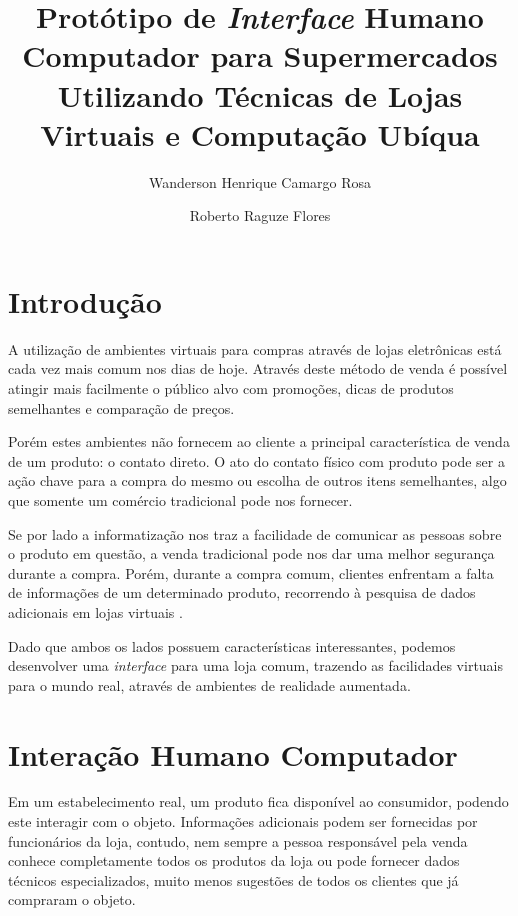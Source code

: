 \documentclass{article}
\title{Protótipo de \emph{Interface} Humano Computador para Supermercados
Utilizando Técnicas de Lojas Virtuais e Computação Ubíqua}
\author{Wanderson Henrique Camargo Rosa \and Roberto Raguze Flores}
\begin{document}
\maketitle{}

\section{Introdução}


A utilização de ambientes virtuais para compras através de lojas eletrônicas
está cada vez mais comum nos dias de hoje. Através deste método de venda é
possível atingir mais facilmente o público alvo com promoções, dicas de produtos
semelhantes e comparação de preços.


Porém estes ambientes não fornecem ao cliente a principal característica de
venda de um produto: o contato direto. O ato do contato físico com produto pode
ser a ação chave para a compra do mesmo ou escolha de outros itens semelhantes,
algo que somente um comércio tradicional pode nos fornecer.

Se por lado a informatização nos traz a facilidade de comunicar as pessoas sobre
o produto em questão, a venda tradicional pode nos dar uma melhor segurança
durante a compra. Porém, durante a compra comum, clientes enfrentam a falta de
informações de um determinado produto, recorrendo à pesquisa de dados adicionais
em lojas virtuais \cite{vonreischach2009}.


Dado que ambos os lados possuem características interessantes, podemos
desenvolver uma \emph{interface} para uma loja comum, trazendo as facilidades
virtuais para o mundo real, através de ambientes de realidade aumentada.

\section{Interação Humano Computador}


Em um estabelecimento real, um produto fica disponível ao consumidor, podendo
este interagir com o objeto. Informações adicionais podem ser fornecidas por
funcionários da loja, contudo, nem sempre a pessoa responsável pela venda
conhece completamente todos os produtos da loja ou pode fornecer dados técnicos
especializados, muito menos sugestões de todos os clientes que já compraram o
objeto.
\end{document}
